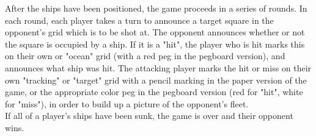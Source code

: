 \qquad After the ships have been positioned, the game proceeds in a series of rounds. In each round, each player takes a turn to announce a target square in the opponent's grid which is to be shot at. The opponent announces whether or not the square is occupied by a ship. If it is a "hit", the player who is hit marks this on their own or "ocean" grid (with a red peg in the pegboard version), and announces what ship was hit. The attacking player marks the hit or miss on their own "tracking" or "target" grid with a pencil marking in the paper version of the game, or the appropriate color peg in the pegboard version (red for "hit", white for "miss"), in order to build up a picture of the opponent's fleet.\\

\qquad If all of a player's ships have been sunk, the game is over and their opponent wins.